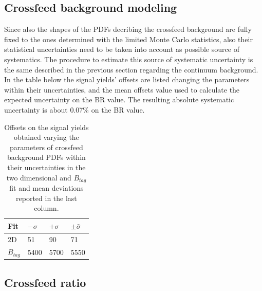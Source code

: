 \subsection{Crossfeed background modeling}\label{sec:chargedCorrCrossfeedPDF}

Since also the shapes of the PDFs decribing the crossfeed background are fully fixed to the ones determined with the limited Monte Carlo statistics, also their statistical uncertainties need to be taken into account as possible source of systematics. 
The procedure to estimate this source of systematic uncertainty is the same described in the previous section regarding the continuum background. In the table below the signal yields' offsets are listed changing the parameters within their uncertainties, 
and the mean offsets value used to calculate the expected uncertainty on the BR value. The resulting absolute systematic uncertainty is about 0.07$\%$ on the BR value.

 \vspace{0.25 cm}
\begin{table}[H]
\begin{tabular}{ |p{2.5cm}||p{2cm}| p{2cm}|  p{2cm}|}
\hline
    Fit    &  $- \sigma$ &  $+ \sigma$ & $ \pm \bar{\sigma}$\\
 \hline
 2D        &     51  & 90  & 71 \\
 $B_{tag}$ &  5400 &  5700 & 5550 \\
 \hline
\end{tabular}
\caption{Offsets on the signal yields obtained varying the parameters of crossfeed background PDFs within their uncertainties in the two dimensional and $B_{tag}$ fit and mean deviations reported in the last column.}
\end{table}
 \vspace{0.25 cm}

\subsection{Crossfeed ratio}\label{sec:chargedCorrCrossfeedSys}

